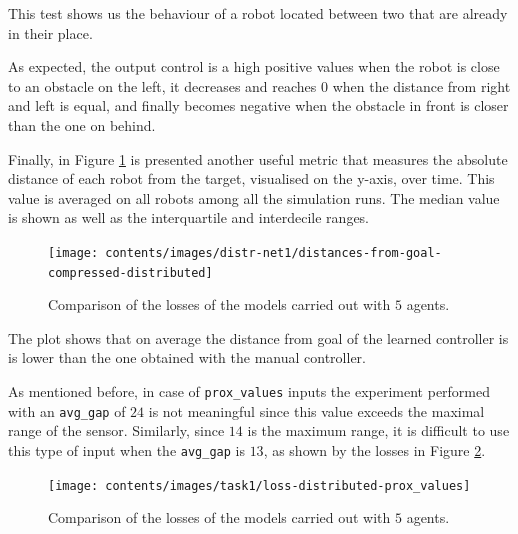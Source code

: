 This test shows us the behaviour of a robot located between two that are already 
in their place.

As expected, the output control is a high positive values when the robot is close to 
an obstacle on the left, it decreases and reaches $0$ when the distance from right 
and left is equal, and finally becomes negative when the obstacle in front is closer 
than the one on behind.

Finally, in Figure \ref{fig:net1distance} is presented another useful metric that 
measures the absolute distance of each robot from the target, visualised on the 
y-axis, over time. This value is averaged on all robots among all the simulation 
runs. The median value is shown as well as the interquartile and interdecile ranges.
\begin{figure}[!htb]
	\centering
	\texttt{[image: contents/images/distr-net1/distances-from-goal-compressed-distributed]}%
	\caption{Comparison of the losses of the models carried out with $5$ agents.}
	\label{fig:net1distance}
\end{figure}

The plot shows that on average the distance from goal of the learned controller is 
is lower than the one obtained with the manual controller.

As mentioned before, in case of \texttt{prox\_values} inputs the 
experiment performed with an \texttt{avg\_gap} of $24$ is not meaningful since 
this value exceeds the maximal range of the sensor. Similarly, since $14$ is the 
maximum range, it is difficult to use this type of input when the \texttt{avg\_gap}  
is $13$, as shown by the losses in Figure \ref{fig:distlossprox_values}.

\begin{figure}[!htb]
	\centering
	\texttt{[image: contents/images/task1/loss-distributed-prox\_values]}%
	\caption{Comparison of the losses of the models carried out with $5$ agents.}
	\label{fig:distlossprox_values}
\end{figure}




